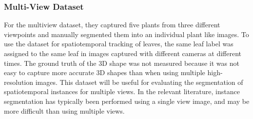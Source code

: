 \subsubsection{Multi-View Dataset}
For the multiview dataset, they captured five plants from three different viewpoints and manually segmented them into an individual plant
like images. To use the dataset for spatiotemporal tracking of leaves, the same leaf label was assigned to the same leaf in images
captured with different cameras at different times. The ground truth of the 3D shape was not measured because it was not easy to
capture more accurate 3D shapes than when using multiple high-resolution images. This dataset will be useful for evaluating the
segmentation of spatiotemporal instances for multiple views. In the relevant literature, instance segmentation has typically been
performed using a single view image, and may be more difficult than using multiple views.

